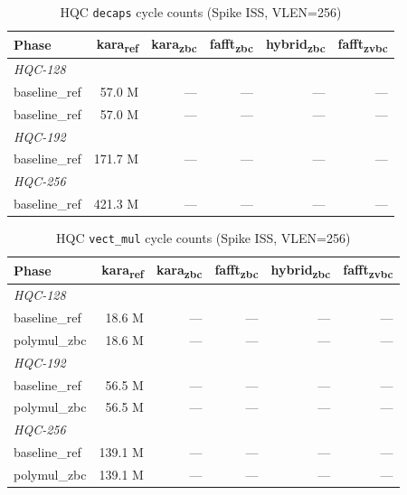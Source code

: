 \begin{table}[h]
  \centering
  \caption{HQC \texttt{decaps} cycle counts (Spike ISS, VLEN=256)}
  \label{tab:decaps_counts}
  \begin{tabular}{lrrrrr}
    \toprule
    Phase & kara\textsubscript{ref} & kara\textsubscript{zbc} & fafft\textsubscript{zbc} & hybrid\textsubscript{zbc} & fafft\textsubscript{zvbc} \\
    \midrule
    \multicolumn{6}{l}{\textit{HQC-128}} \\
    baseline_ref & 57.0 M & — & — & — & — \\
    baseline_ref & 57.0 M & — & — & — & — \\
    \multicolumn{6}{l}{\textit{HQC-192}} \\
    baseline_ref & 171.7 M & — & — & — & — \\
    \multicolumn{6}{l}{\textit{HQC-256}} \\
    baseline_ref & 421.3 M & — & — & — & — \\
    \bottomrule
  \end{tabular}
\end{table}

\begin{table}[h]
  \centering
  \caption{HQC \texttt{vect_mul} cycle counts (Spike ISS, VLEN=256)}
  \label{tab:vect_mul_counts}
  \begin{tabular}{lrrrrr}
    \toprule
    Phase & kara\textsubscript{ref} & kara\textsubscript{zbc} & fafft\textsubscript{zbc} & hybrid\textsubscript{zbc} & fafft\textsubscript{zvbc} \\
    \midrule
    \multicolumn{6}{l}{\textit{HQC-128}} \\
    baseline_ref & 18.6 M & — & — & — & — \\
    polymul_zbc & 18.6 M & — & — & — & — \\
    \multicolumn{6}{l}{\textit{HQC-192}} \\
    baseline_ref & 56.5 M & — & — & — & — \\
    polymul_zbc & 56.5 M & — & — & — & — \\
    \multicolumn{6}{l}{\textit{HQC-256}} \\
    baseline_ref & 139.1 M & — & — & — & — \\
    polymul_zbc & 139.1 M & — & — & — & — \\
    \bottomrule
  \end{tabular}
\end{table}
